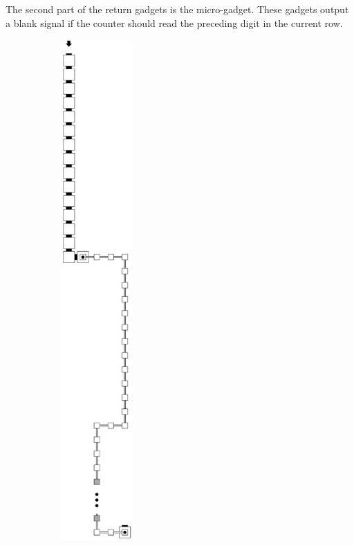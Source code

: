 The second part of the return gadgets is the {\readnext} micro-gadget. These gadgets output a blank {\dwriter}
signal if the counter should read the preceding digit in the current row.

\begin{figure}[H]
    \centering
    \begin{subfigure}[t]{0.3\textwidth}
        \centering
        \includegraphics[width=0.3\textwidth]{return_paths/read_next_1-or-2_op}

\end{subfigure}
\end{figure}
